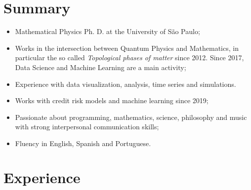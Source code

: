 \documentclass[11pt,a4paper,sans]{moderncv}        %
\begin{document}
\makecvtitle

\section{Summary}

\begin{itemize} 
\item Mathematical Physics Ph. D. at the University of S\~{a}o Paulo;
\item Works in the intersection between Quantum Physics and Mathematics, in particular the so called \emph{Topological phases of matter} since 2012. Since 2017, Data Science and Machine Learning are a main activity;
\item Experience with data visualization, analysis, time series and simulations.
\item Works with credit risk models and machine learning since 2019; 
\item Passionate about programming, mathematics, science, philosophy and music with strong interpersonal communication skills;
\item Fluency in English, Spanish and Portuguese.
\end{itemize} 

\section{Experience}

\vspace{3pt}
\end{document}
